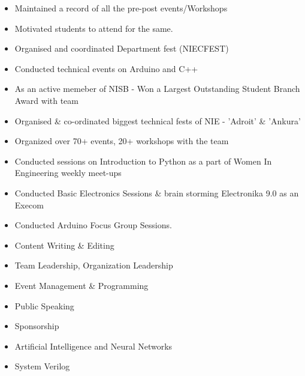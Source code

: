 \documentclass[10pt,a4paper,ragged2e]{altacv}
\begin{document}
\divider

\begin{itemize}
\item Maintained a record of all the pre-post events/Workshops 
\item Motivated  students to attend for the same.
\end{itemize}
\divider

 {}{}
\begin{itemize}
\item Organised and coordinated Department fest (NIECFEST)
\item Conducted technical events on Arduino and C++
\end{itemize}
\divider
\begin{itemize}
\item As an active memeber of NISB - Won a Largest Outstanding Student Branch Award with team
\item Organised \& co-ordinated biggest technical fests of NIE - 'Adroit' \& 'Ankura'
\item Organized over 70+ events, 20+ workshops with the team
\item Conducted sessions on Introduction to Python as a part of Women In Engineering weekly meet-ups
\item Conducted Basic Electronics Sessions \& brain storming Electronika 9.0 as an Execom
\item Conducted Arduino Focus Group Sessions.
\end{itemize}

\begin{itemize}
\item Content Writing \& Editing
\item Team Leadership, Organization Leadership
\item Event Management \& Programming
\item Public Speaking
\item Sponsorship 
\end{itemize}

\begin{itemize}
\item Artificial Intelligence and Neural Networks
\item System Verilog
\end{itemize}
\end{document}
